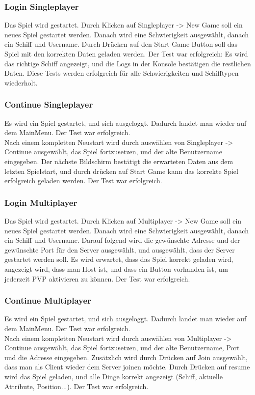 \documentclass[fontsize=12pt,paper=a4,twoside]{scrartcl}
\begin{document}
\subsubsection{Login Singleplayer}
Das Spiel wird gestartet. Durch Klicken auf Singleplayer -> New Game soll ein neues Spiel gestartet werden. Danach wird eine Schwierigkeit ausgewählt, danach ein Schiff und Username. Durch Drücken auf den Start Game Button soll das Spiel mit den korrekten Daten geladen werden. Der Test war erfolgreich: Es wird das richtige Schiff angezeigt, und die Logs in der Konsole bestätigen die restlichen Daten. Diese Tests werden erfolgreich für alle Schwierigkeiten und Schifftypen wiederholt. \\
\subsubsection{Continue Singleplayer}
Es wird ein Spiel gestartet, und sich ausgeloggt. Dadurch landet man wieder auf dem MainMenu. Der Test war erfolgreich. \\
Nach einem kompletten Neustart wird durch auswählen von Singleplayer -> Continue ausgewählt, das Spiel fortzusetzen, und der alte Benutzername eingegeben. Der nächste Bildschirm bestätigt die erwarteten Daten aus dem letzten Spielstart, und durch drücken auf Start Game kann das korrekte Spiel erfolgreich geladen werden. Der Test war erfolgreich. \\
\subsubsection{Login Multiplayer}
Das Spiel wird gestartet. Durch Klicken auf Multiplayer -> New Game soll ein neues Spiel gestartet werden. Danach wird eine Schwierigkeit ausgewählt, danach ein Schiff und Username. Darauf folgend wird die gewünschte Adresse und der gewünschte Port für den Server ausgewählt, und ausgewählt, dass der Server gestartet werden soll. Es wird erwartet, dass das Spiel korrekt geladen wird, angezeigt wird, dass man Host ist, und dass ein Button vorhanden ist, um jederzeit PVP aktivieren zu können. Der Test war erfolgreich. \\
\subsubsection{Continue Multiplayer}
Es wird ein Spiel gestartet, und sich ausgeloggt. Dadurch landet man wieder auf dem MainMenu. Der Test war erfolgreich. \\
Nach einem kompletten Neustart wird durch auswählen von Multiplayer -> Continue ausgewählt, das Spiel fortzusetzen, und der alte Benutzername, Port und die Adresse eingegeben. Zusätzlich wird durch Drücken auf Join ausgewählt, dass man als Client wieder dem Server joinen möchte. Durch Drücken auf resume wird das Spiel geladen, und alle Dinge korrekt angezeigt (Schiff, aktuelle Attribute, Position...). Der Test war erfolgreich. \\
\end{document}
